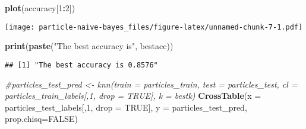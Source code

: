 \documentclass[
]{article}
\newenvironment{Shaded}{\begin{snugshade}}{\end{snugshade}}
\newcommand{\CommentTok}[1]{\textcolor[rgb]{0.56,0.35,0.01}{\textit{#1}}}
\newcommand{\DataTypeTok}[1]{\textcolor[rgb]{0.13,0.29,0.53}{#1}}
\newcommand{\DecValTok}[1]{\textcolor[rgb]{0.00,0.00,0.81}{#1}}
\newcommand{\KeywordTok}[1]{\textcolor[rgb]{0.13,0.29,0.53}{\textbf{#1}}}
\newcommand{\NormalTok}[1]{#1}
\newcommand{\OperatorTok}[1]{\textcolor[rgb]{0.81,0.36,0.00}{\textbf{#1}}}
\newcommand{\OtherTok}[1]{\textcolor[rgb]{0.56,0.35,0.01}{#1}}
\newcommand{\StringTok}[1]{\textcolor[rgb]{0.31,0.60,0.02}{#1}}
\begin{document}
\begin{Shaded}
\begin{Highlighting}[]
\KeywordTok{plot}\NormalTok{(accuracy[}\DecValTok{1}\OperatorTok{:}\DecValTok{2}\NormalTok{])}
\end{Highlighting}
\end{Shaded}

\texttt{[image: particle-naive-bayes\_files/figure-latex/unnamed-chunk-7-1.pdf]}

\begin{Shaded}
\begin{Highlighting}[]
\KeywordTok{print}\NormalTok{(}\KeywordTok{paste}\NormalTok{(}\StringTok{"The best accuracy is"}\NormalTok{, bestacc))}
\end{Highlighting}
\end{Shaded}

\begin{verbatim}
## [1] "The best accuracy is 0.8576"
\end{verbatim}

\begin{Shaded}
\begin{Highlighting}[]
\CommentTok{#particles_test_pred <- knn(train = particles_train, test = particles_test, cl = particles_train_labels[,1, drop = TRUE], k = bestk)}
\KeywordTok{CrossTable}\NormalTok{(}\DataTypeTok{x =}\NormalTok{ particles_test_labels[,}\DecValTok{1}\NormalTok{, }\DataTypeTok{drop =} \OtherTok{TRUE}\NormalTok{], }\DataTypeTok{y =}\NormalTok{ particles_test_pred, }\DataTypeTok{prop.chisq=}\OtherTok{FALSE}\NormalTok{)}
\end{Highlighting}
\end{Shaded}
\end{document}

